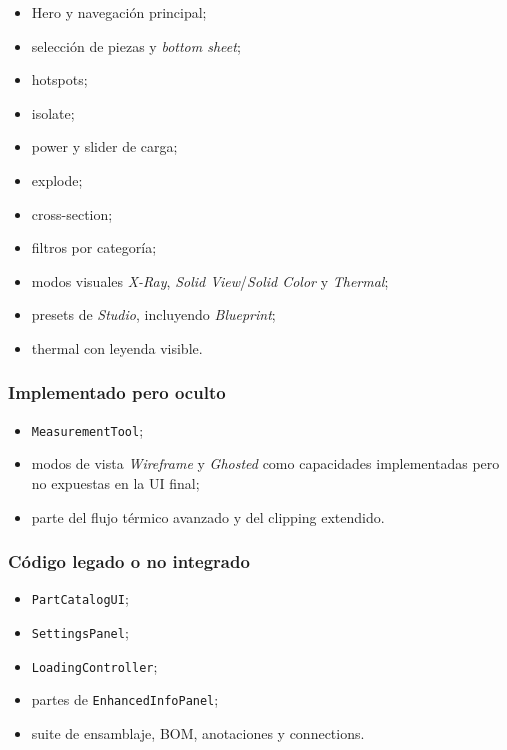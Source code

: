 \begin{itemize}
    \item Hero y navegación principal;
    \item selección de piezas y \textit{bottom sheet};
    \item hotspots;
    \item isolate;
    \item power y slider de carga;
    \item explode;
    \item cross-section;
    \item filtros por categoría;
    \item modos visuales \textit{X-Ray}, \textit{Solid View}/\textit{Solid Color} y \textit{Thermal};
    \item presets de \textit{Studio}, incluyendo \textit{Blueprint};
    \item thermal con leyenda visible.
\end{itemize}

\subsubsection{Implementado pero oculto}

\begin{itemize}
    \item \texttt{MeasurementTool};
    \item modos de vista \textit{Wireframe} y \textit{Ghosted} como capacidades implementadas pero no expuestas en la UI final;
    \item parte del flujo térmico avanzado y del clipping extendido.
\end{itemize}

\subsubsection{Código legado o no integrado}

\begin{itemize}
    \item \texttt{PartCatalogUI};
    \item \texttt{SettingsPanel};
    \item \texttt{LoadingController};
    \item partes de \texttt{EnhancedInfoPanel};
    \item suite de ensamblaje, BOM, anotaciones y connections.
\end{itemize}

